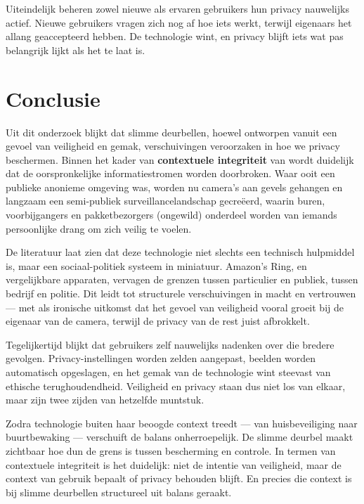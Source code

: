 \documentclass[nonacm, sigconf, balance=true]{acmart}
\begin{document}
    Uiteindelijk beheren zowel nieuwe als ervaren gebruikers hun privacy nauwelijks actief.
    Nieuwe gebruikers vragen zich nog af hoe iets werkt, terwijl eigenaars het allang geaccepteerd hebben.
    De technologie wint, en privacy blijft iets wat pas belangrijk lijkt als het te laat is.

    \section{Conclusie}
    Uit dit onderzoek blijkt dat slimme deurbellen, hoewel ontworpen vanuit een gevoel van veiligheid en gemak, verschuivingen veroorzaken in hoe we privacy beschermen.
    Binnen het kader van \textbf{contextuele integriteit} van \citeauthor{nissenbaum2009privacy} wordt duidelijk dat de oorspronkelijke informatiestromen worden doorbroken.
    Waar ooit een publieke anonieme omgeving was, worden nu camera's aan gevels gehangen en langzaam een semi-publiek surveillancelandschap gecreëerd, waarin buren, voorbijgangers en pakketbezorgers (ongewild) onderdeel worden van iemands persoonlijke drang om zich veilig te voelen.

    De literatuur laat zien dat deze technologie niet slechts een technisch hulpmiddel is, maar een sociaal-politiek systeem in miniatuur.
    Amazon’s Ring, en vergelijkbare apparaten, vervagen de grenzen tussen particulier en publiek, tussen bedrijf en politie.
    Dit leidt tot structurele verschuivingen in macht en vertrouwen — met als ironische uitkomst dat het gevoel van veiligheid vooral groeit bij de eigenaar van de camera, terwijl de privacy van de rest juist afbrokkelt.

    Tegelijkertijd blijkt dat gebruikers zelf nauwelijks nadenken over die bredere gevolgen.
    Privacy-instellingen worden zelden aangepast, beelden worden automatisch opgeslagen, en het gemak van de technologie wint steevast van ethische terughoudendheid.
    Veiligheid en privacy staan dus niet los van elkaar, maar zijn twee zijden van hetzelfde muntstuk.

    Zodra technologie buiten haar beoogde context treedt — van huisbeveiliging naar buurtbewaking — verschuift de balans onherroepelijk.
    De slimme deurbel maakt zichtbaar hoe dun de grens is tussen bescherming en controle.
    In termen van contextuele integriteit is het duidelijk: niet de intentie van veiligheid, maar de context van gebruik bepaalt of privacy behouden blijft.
    En precies die context is bij slimme deurbellen structureel uit balans geraakt.
\end{document}
